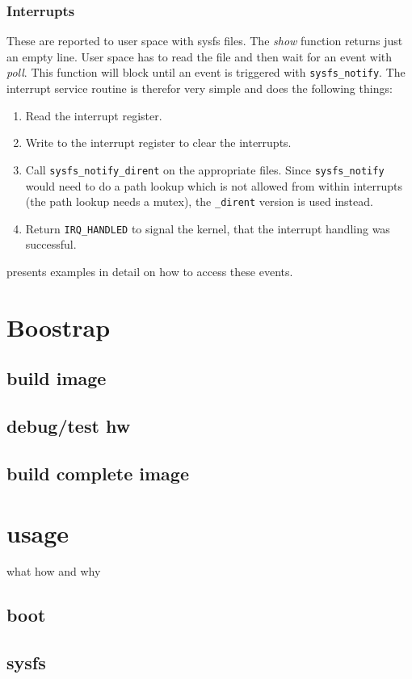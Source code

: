 \documentclass[11pt,technote,a4paper,onecolumn,dvips]{IEEEtran}
\begin{document}
\subsubsection{Interrupts}
These are reported to user space with sysfs files. The \emph{show} function
returns just an empty line. User space has to read the file and then wait for
an event with \emph{poll}. This function will block until an event is
triggered with \lstinline+sysfs_notify+. The interrupt service routine is
therefor very simple and does the following things:
\begin{enumerate}
    \item Read the interrupt register.
    \item Write to the interrupt register to clear the interrupts.
    \item Call \lstinline+sysfs_notify_dirent+ on the appropriate files. Since
        \lstinline+sysfs_notify+ would need to do a path lookup which is not
        allowed from within interrupts (the path lookup needs a mutex), the
        \lstinline+_dirent+ version is used instead.
    \item Return \lstinline+IRQ_HANDLED+ to signal the kernel, that the
        interrupt handling was successful.
\end{enumerate}
 presents examples in detail on how to access these events.
\section{Boostrap}
\subsection{build image}
\subsection{debug/test hw}
\subsection{build complete image}
\section{usage}
what how and why
\subsection{boot}
\subsection{sysfs}
\label{sec:sysfs}
\end{document}
